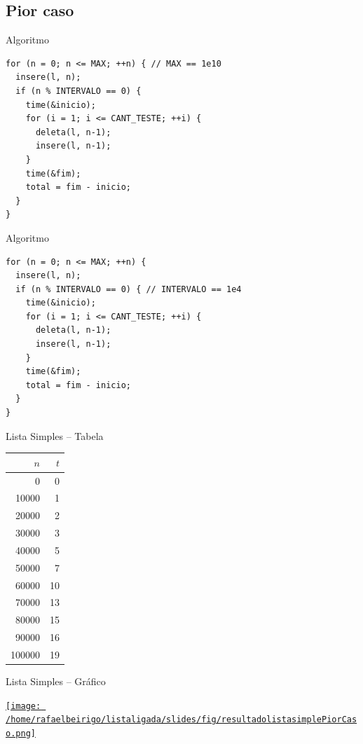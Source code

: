 \documentclass[bigger]{beamer}
\begin{document}
\subsection{Pior caso}
\label{sec-3-2}
\begin{frame}[fragile,label=sec-3-2-1]{Algoritmo}
 \begin{verbatim}
for (n = 0; n <= MAX; ++n) { // MAX == 1e10
  insere(l, n);
  if (n % INTERVALO == 0) {
    time(&inicio);
    for (i = 1; i <= CANT_TESTE; ++i) {
      deleta(l, n-1);
      insere(l, n-1);
    }
    time(&fim);
    total = fim - inicio;
  }
}
\end{verbatim}
\end{frame}
\begin{frame}[fragile,label=sec-3-2-2]{Algoritmo}
 \begin{verbatim}
for (n = 0; n <= MAX; ++n) {
  insere(l, n);
  if (n % INTERVALO == 0) { // INTERVALO == 1e4
    time(&inicio);
    for (i = 1; i <= CANT_TESTE; ++i) {
      deleta(l, n-1);
      insere(l, n-1);
    }
    time(&fim);
    total = fim - inicio;
  }
}
\end{verbatim}
\end{frame}
\begin{frame}[label=sec-3-2-3]{Lista Simples -- Tabela}
\begin{center}
\begin{tabular}{rr}
$n$ & $t$\\
\hline
0 & 0\\
10000 & 1\\
20000 & 2\\
30000 & 3\\
40000 & 5\\
50000 & 7\\
60000 & 10\\
70000 & 13\\
80000 & 15\\
90000 & 16\\
100000 & 19\\
\end{tabular}
\end{center}
\end{frame}
\begin{frame}[label=sec-3-2-4]{Lista Simples -- Gráfico}
\begin{center}
\href{fig/resultadolistasimplePiorCaso-slides.png}{\texttt{[image: /home/rafaelbeirigo/listaligada/slides/fig/resultadolistasimplePiorCaso.png]}}
\end{center}
\end{frame}
\end{document}
